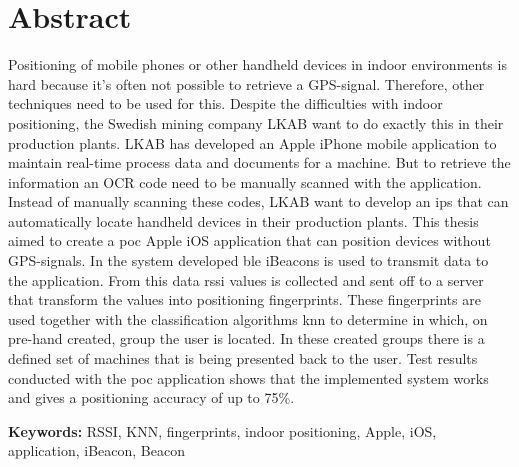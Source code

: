 \newpage
\chapter*{Abstract}
Positioning of mobile phones or other handheld devices in indoor environments is hard because it's often not possible to retrieve a GPS-signal.
Therefore, other techniques need to be used for this.
Despite the difficulties with indoor positioning, the Swedish mining company LKAB want to do exactly this in  their production plants.
LKAB has developed an Apple iPhone mobile application to maintain real-time process data and documents for a machine.
But to retrieve the information an OCR code need to be manually scanned with the application.
Instead of manually scanning these codes, LKAB want to develop an \acrlong{ips} that can automatically locate handheld devices in their production plants.
This thesis aimed to create a \acrlong{poc} Apple iOS application that can position devices without GPS-signals.
In the system developed \acrlong{ble} iBeacons is used to transmit data to the application.
From this data \acrlong{rssi} values is  collected and sent off to a server that transform the values into positioning fingerprints.
These fingerprints are used together with the classification algorithms \acrlong{knn} to determine in which, on pre-hand created, group the user is located.
In these created groups there is a defined set of machines that is being presented back to the user.
Test results conducted with the \acrlong{poc} application shows that the implemented system works and gives a positioning accuracy of up to 75\%.


\bigskip

\textbf{Keywords:} RSSI, KNN, fingerprints, indoor positioning, Apple, iOS, application, iBeacon, Beacon
